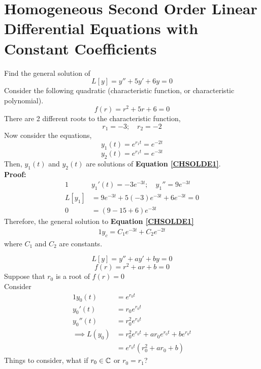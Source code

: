 \documentclass[diffeq.tex]{subfiles}
\begin{document}
\section{Homogeneous Second Order Linear Differential Equations with Constant Coefficients}
\begin{example}[CHSOLDE]
    Find the general solution of
    \begin{equation}
        \label{CHSOLDE1}
        L[y] = y'' + 5y' + 6y = 0
    \end{equation}
    Consider the following quadratic (characteristic function, or characteristic polynomial).
    \begin{equation}
        f(r) = r^{2} + 5r + 6 = 0
    \end{equation}
    There are 2 different roots to the characteristic function,
    \begin{equation}
        r_{1} = -3;\quad r_{2} = -2
    \end{equation}
    Now consider the equations,
    \begin{equation}
        y_{1}(t) = e^{r_{1}t} = e^{-2t}
    \end{equation}
    \begin{equation}
        y_{2}(t) = e^{r_{1}t} = e^{-3t}
    \end{equation}
    Then, $y_{1}(t)$ and $y_{2}(t)$ are solutions of \textbf{Equation \ref{CHSOLDE1}}.\\
    \textbf{Proof:}
    \begin{alignat}{1}
        &y_{1}'(t) = -3e^{-3t};\quad y_{1}'' = 9e^{-3t}\\
        L[y_{1}] &= 9e^{-3t} + 5(-3)e^{-3t} + 6e^{-3t} = 0 \\
        0&= (9 - 15 + 6)e^{-3t}
    \end{alignat}
    Therefore, the general solution to \textbf{Equation \ref{CHSOLDE1}}
    \begin{alignat}{1}
        y_{c} = C_{1}e^{-3t} + C_{2}e^{-2t}
    \end{alignat}
    where $C_1$ and $C_2$ are constants.
\end{example}
\np
\begin{example}
    \begin{equation}
        L[y] = y'' + ay' + by = 0
    \end{equation}
    \begin{equation}
        f(r) = r^{2} + ar + b = 0
    \end{equation}
    Suppose that $r_{0}$ is a root of $f(r) = 0$\\
    Consider \begin{alignat}{1}
        y_{0}(t) &= e^{r_{0}t}\\
        y_{0}'(t) &= r_{0}e^{r_{0}t}\\
        y_{0}''(t) &= r_{0}^{2}e^{r_{0}t}\\
        \implies L(y_{0}) &= r_{0}^{2}e^{r_{0}t} + ar_{0}e^{r_{0}t} + be^{r_{0}t}\\
        &=e^{r_{0}t}(r_{0}^{2} + ar_{0} + b)
    \end{alignat}
    Things to consider, what if $r_{0} \in \mathbb{C}$ or $r_{0} = r_{1}$?
\end{example}
\end{document}
